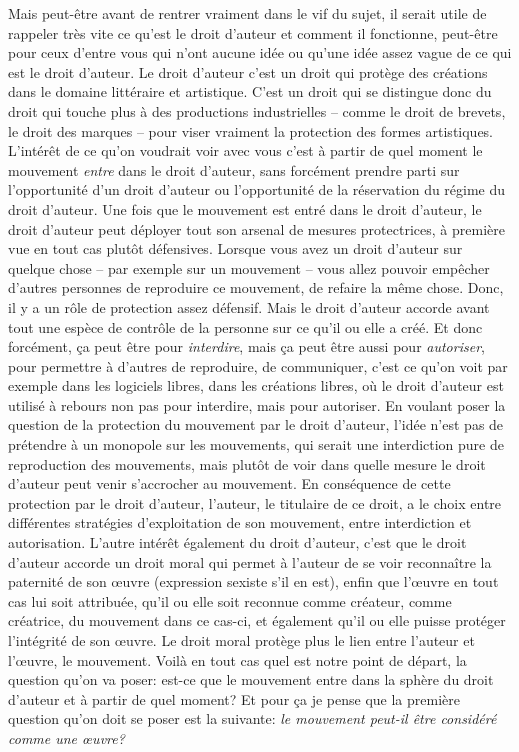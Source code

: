 {Mais peut{}-\^etre avant de rentrer vraiment dans le vif du sujet, il
serait utile de rappeler tr\`es vite ce qu'est le droit d'auteur et
comment il fonctionne, peut{}-\^etre pour ceux d'entre vous qui n'ont
aucune id\'ee ou qu'une id\'ee assez vague de ce qui est le droit
d'auteur. Le droit d'auteur c'est un droit qui prot\`ege des
cr\'eations dans le domaine litt\'eraire et artistique. C'est un droit
qui se distingue donc du droit qui touche plus \`a des productions
industrielles {--} comme le droit de brevets, le droit des marques
{--} pour viser vraiment la protection des formes artistiques.
L'int\'er\^et de ce qu'on voudrait voir avec vous c'est \`a partir de
quel moment le mouvement {\em entre} dans le droit d'auteur, sans
forc\'ement prendre parti sur l'opportunit\'e d'un droit d'auteur ou
l'opportunit\'e de la r\'eservation du r\'egime du droit d'auteur. Une
fois que le mouvement est entr\'e dans le droit d'auteur, le droit
d'auteur peut d\'eployer tout son arsenal de mesures protectrices, \`a
premi\`ere vue en tout cas plut\^ot d\'efensives. Lorsque vous avez un
droit d'auteur sur quelque chose {--} par exemple sur un mouvement
{--} vous allez pouvoir emp\^echer d'autres personnes de reproduire ce
mouvement, de refaire la m\^eme chose. Donc, il y a un r\^ole de
protection assez d\'efensif. Mais le droit d'auteur accorde avant tout
une esp\`ece de contr\^ole de la personne sur ce qu'il ou elle a
cr\'e\'e. Et donc forc\'ement, \c{c}a peut \^etre pour
{\em interdire}, mais \c{c}a peut \^etre aussi pour
{\em autoriser}, pour permettre \`a d'autres de reproduire, de
communiquer, c'est ce qu'on voit par exemple dans les logiciels libres,
dans les cr\'eations libres, o\`u le droit d'auteur est utilis\'e \`a
rebours non pas pour interdire, mais pour autoriser. En voulant poser
la question de la protection du mouvement par le droit d'auteur,
l'id\'ee n'est pas de pr\'etendre \`a un monopole sur les mouvements,
qui serait une interdiction pure de reproduction des mouvements, mais
plut\^ot de voir dans quelle mesure le droit d'auteur peut venir
s'accrocher au mouvement. En cons\'equence de cette protection par le
droit d'auteur, l'auteur, le titulaire de ce droit, a
le choix entre diff\'erentes strat\'egies d'exploitation de son
mouvement, entre interdiction et autorisation. L'autre int\'er\^et
\'egalement du droit d'auteur, c'est que le droit d'auteur accorde un
droit moral qui permet \`a l'auteur de se voir reconna\^itre la
paternit\'e de son {\oe}uvre (expression sexiste s'il en est), enfin
que l'{\oe}uvre en tout cas lui soit attribu\'ee, qu'il ou elle soit
reconnue comme cr\'eateur, comme cr\'eatrice, du mouvement dans ce
cas{}-ci, et \'egalement qu'il ou elle puisse
prot\'eger l'int\'egrit\'e de son {\oe}uvre. Le droit moral prot\`ege
plus le lien entre l'auteur et l'{\oe}uvre, le mouvement. Voil\`a en
tout cas quel est notre point de d\'epart, la question qu'on va poser:
est{}-ce que le mouvement entre dans la sph\`ere du droit d'auteur et
\`a partir de quel moment? Et pour \c{c}a je pense que la premi\`ere
question qu'on doit se poser est la suivante: {\em le mouvement
peut{}-il \^etre consid\'er\'e comme une {\oe}uvre?}\par

}
